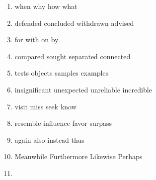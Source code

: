 \newpage
\begin{enumerate}
	\item

\fourchoices
{when}
{why}
{how}
{what}




\item


\fourchoices
{defended}
{concluded}
{withdrawn}
{advised}




\item


\fourchoices
{for}
{with}
{on}
{by}




\item


\fourchoices
{compared}
{sought}
{separated}
{connected}




\item


\fourchoices
{tests}
{objects}
{samples}
{examples}




\item

\fourchoices
{insignificant}
{unexpected}
{unreliable}
{incredible}



\item


\fourchoices
{visit}
{miss}
{seek}
{know}




\item


\fourchoices
{resemble}
{influence}
{favor}
{surpass}




\item


\fourchoices
{again}
{also}
{instead}
{thus}




\item

\fourchoices
{Meanwhile}
{Furthermore}
{Likewise}
{Perhaps}



\item



\end{enumerate}
